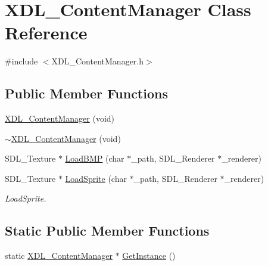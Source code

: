 \hypertarget{class_x_d_l___content_manager}{\section{X\-D\-L\-\_\-\-Content\-Manager Class Reference}
\label{class_x_d_l___content_manager}
}


{\ttfamily \#include $<$X\-D\-L\-\_\-\-Content\-Manager.\-h$>$}

\subsection*{Public Member Functions}
\begin{DoxyCompactItemize}
\item 
\hyperlink{class_x_d_l___content_manager_af04e583d32143b502cb060261159853d}{X\-D\-L\-\_\-\-Content\-Manager} (void)
\item 
\hyperlink{class_x_d_l___content_manager_a2d7112bce7c871270e070e4c69179e3b}{$\sim$\-X\-D\-L\-\_\-\-Content\-Manager} (void)
\item 
S\-D\-L\-\_\-\-Texture $\ast$ \hyperlink{class_x_d_l___content_manager_a99571fb38d9673ede5cd8598b3081f11}{Load\-B\-M\-P} (char $\ast$\-\_\-path, S\-D\-L\-\_\-\-Renderer $\ast$\-\_\-renderer)
\item 
S\-D\-L\-\_\-\-Texture $\ast$ \hyperlink{class_x_d_l___content_manager_a833df37fbdf51abe274454f4cfee1d0c}{Load\-Sprite} (char $\ast$\-\_\-path, S\-D\-L\-\_\-\-Renderer $\ast$\-\_\-renderer)
\begin{DoxyCompactList}\small\item\em Load\-Sprite. \end{DoxyCompactList}\end{DoxyCompactItemize}
\subsection*{Static Public Member Functions}
\begin{DoxyCompactItemize}
\item 
static \hyperlink{class_x_d_l___content_manager}{X\-D\-L\-\_\-\-Content\-Manager} $\ast$ \hyperlink{class_x_d_l___content_manager_ab1ce9134a3c5a21f8372b0224559cb81}{Get\-Instance} ()
\end{DoxyCompactItemize}


